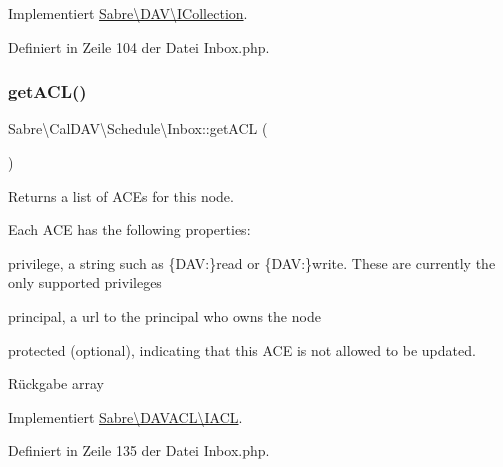 Implementiert \mbox{\hyperlink{interface_sabre_1_1_d_a_v_1_1_i_collection_a837d88dac548706770368200f83c2ebc}{Sabre\textbackslash{}\+D\+A\+V\textbackslash{}\+I\+Collection}}.



Definiert in Zeile 104 der Datei Inbox.\+php.

\mbox{\label{class_sabre_1_1_cal_d_a_v_1_1_schedule_1_1_inbox_a032faf190d9a2cb08354ecaeca948e8f}} 
\subsubsection{\texorpdfstring{get\+A\+C\+L()}{getACL()}}
{\footnotesize\ttfamily Sabre\textbackslash{}\+Cal\+D\+A\+V\textbackslash{}\+Schedule\textbackslash{}\+Inbox\+::get\+A\+CL (\begin{DoxyParamCaption}{ }\end{DoxyParamCaption})}

Returns a list of A\+CE\textquotesingle{}s for this node.

Each A\+CE has the following properties\+:
\begin{DoxyItemize}
\item \textquotesingle{}privilege\textquotesingle{}, a string such as \{D\+AV\+:\}read or \{D\+AV\+:\}write. These are currently the only supported privileges
\item \textquotesingle{}principal\textquotesingle{}, a url to the principal who owns the node
\item \textquotesingle{}protected\textquotesingle{} (optional), indicating that this A\+CE is not allowed to be updated.
\end{DoxyItemize}

\begin{DoxyReturn}{Rückgabe}
array 
\end{DoxyReturn}


Implementiert \mbox{\hyperlink{interface_sabre_1_1_d_a_v_a_c_l_1_1_i_a_c_l_a8fe3b3a5b48eae789d7eb722b340045c}{Sabre\textbackslash{}\+D\+A\+V\+A\+C\+L\textbackslash{}\+I\+A\+CL}}.



Definiert in Zeile 135 der Datei Inbox.\+php.


